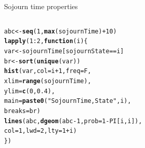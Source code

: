 \documentclass{beamer}\usepackage[]{graphicx}\usepackage[]{color}
\makeatletter
\newcommand{\hlnum}[1]{\textcolor[rgb]{0.686,0.059,0.569}{#1}}%
\newcommand{\hlstr}[1]{\textcolor[rgb]{0.192,0.494,0.8}{#1}}%
\newcommand{\hlopt}[1]{\textcolor[rgb]{0,0,0}{#1}}%
\newcommand{\hlstd}[1]{\textcolor[rgb]{0.345,0.345,0.345}{#1}}%
\newcommand{\hlkwa}[1]{\textcolor[rgb]{0.161,0.373,0.58}{\textbf{#1}}}%
\newcommand{\hlkwb}[1]{\textcolor[rgb]{0.69,0.353,0.396}{#1}}%
\newcommand{\hlkwc}[1]{\textcolor[rgb]{0.333,0.667,0.333}{#1}}%
\newcommand{\hlkwd}[1]{\textcolor[rgb]{0.737,0.353,0.396}{\textbf{#1}}}%
\newenvironment{kframe}{%
 \def\at@end@of@kframe{}%
 \ifinner\ifhmode%
  \def\at@end@of@kframe{\end{minipage}}%
  \begin{minipage}{\columnwidth}%
 \fi\fi%
 \def\FrameCommand##1{\hskip\@totalleftmargin \hskip-\fboxsep
 \colorbox{shadecolor}{##1}\hskip-\fboxsep
     \hskip-\linewidth \hskip-\@totalleftmargin \hskip\columnwidth}%
 \MakeFramed {\advance\hsize-\width
   \@totalleftmargin\z@ \linewidth\hsize
   \@setminipage}}%
 {\par\unskip\endMakeFramed%
 \at@end@of@kframe}
\newenvironment{knitrout}{}{} %
\makeatother
\begin{document}
\begin{frame}[fragile]{Sojourn time properties}
\begin{columns}
\begin{column}{0.5\textwidth}
\begin{knitrout}
\begin{kframe}
\begin{alltt}
\hlstd{abc} \hlkwb{<-} \hlkwd{seq}\hlstd{(}\hlnum{1}\hlstd{,} \hlkwd{max}\hlstd{(sojournTime)}\hlopt{+}\hlnum{10}\hlstd{)}
\hlkwd{lapply}\hlstd{(}\hlnum{1}\hlopt{:}\hlnum{2}\hlstd{,} \hlkwa{function}\hlstd{(}\hlkwc{i}\hlstd{)\{}
  \hlstd{var} \hlkwb{<-} \hlstd{sojournTime[sojournState}\hlopt{==}\hlstd{i]}
  \hlstd{br} \hlkwb{<-} \hlkwd{sort}\hlstd{(}\hlkwd{unique}\hlstd{(var))}
  \hlkwd{hist}\hlstd{(var,} \hlkwc{col}\hlstd{=i}\hlopt{+}\hlnum{1}\hlstd{,} \hlkwc{freq}\hlstd{=F,}
       \hlkwc{xlim}\hlstd{=}\hlkwd{range}\hlstd{(sojournTime),}
       \hlkwc{ylim}\hlstd{=}\hlkwd{c}\hlstd{(}\hlnum{0}\hlstd{,}\hlnum{0.4}\hlstd{),}
       \hlkwc{main}\hlstd{=}\hlkwd{paste0}\hlstd{(}\hlstr{"Sojourn Time, State "}\hlstd{, i),}
       \hlkwc{breaks}\hlstd{=br)}
  \hlkwd{lines}\hlstd{(abc,} \hlkwd{dgeom}\hlstd{(abc}\hlopt{-}\hlnum{1}\hlstd{,} \hlkwc{prob} \hlstd{=} \hlnum{1}\hlopt{-}\hlstd{PI[i,i]),}
        \hlkwc{col}\hlstd{=}\hlnum{1}\hlstd{,} \hlkwc{lwd}\hlstd{=}\hlnum{2}\hlstd{,} \hlkwc{lty} \hlstd{=} \hlnum{1}\hlopt{+}\hlstd{i)}
\hlstd{\})}
\end{alltt}
\end{kframe}
\end{knitrout}
\end{column}
\begin{column}{0.4\textwidth}
\\

\end{column}
\end{columns}
\end{frame}
\end{document}
